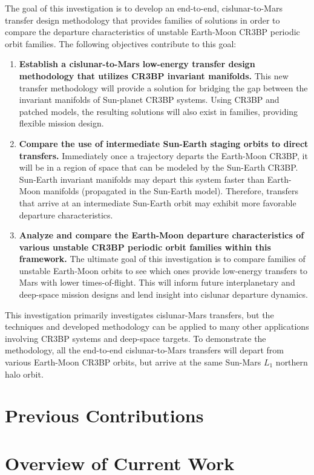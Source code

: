 The goal of this investigation is to develop an end-to-end, cislunar-to-Mars transfer design
methodology that provides families of solutions in order to compare the departure characteristics
of unstable Earth-Moon CR3BP periodic orbit families. The following objectives contribute to this
goal:
\begin{enumerate}
    \item   \textbf{Establish a cislunar-to-Mars low-energy transfer design methodology that
            utilizes CR3BP invariant manifolds.} This new transfer methodology will provide a
            solution for bridging the gap between the invariant manifolds of Sun-planet CR3BP
            systems. Using CR3BP and patched models, the resulting solutions will also exist in
            families, providing flexible mission design.
    \item   \textbf{Compare the use of intermediate Sun-Earth staging orbits to direct transfers.}
            Immediately once a trajectory departs the Earth-Moon CR3BP, it will be in a region of
            space that can be modeled by the Sun-Earth CR3BP. Sun-Earth invariant manifolds may
            depart this system faster than Earth-Moon manifolds (propagated in the Sun-Earth
            model). Therefore, transfers that arrive at an intermediate Sun-Earth orbit may exhibit
            more favorable departure characteristics.
    \item   \textbf{Analyze and compare the Earth-Moon departure characteristics of various
            unstable CR3BP periodic orbit families within this framework.} The ultimate goal of
            this investigation is to compare families of unstable Earth-Moon orbits to see which
            ones provide low-energy transfers to Mars with lower times-of-flight. This will inform
            future interplanetary and deep-space mission designs and lend insight into cislunar
            departure dynamics.
\end{enumerate}
This investigation primarily investigates cislunar-Mars transfers, but the techniques and developed
methodology can be applied to many other applications involving CR3BP systems and deep-space
targets. To demonstrate the methodology, all the end-to-end cislunar-to-Mars transfers will depart
from various Earth-Moon CR3BP orbits, but arrive at the same Sun-Mars $L_{1}$ northern halo orbit.

\section{Previous Contributions}


\section{Overview of Current Work}

